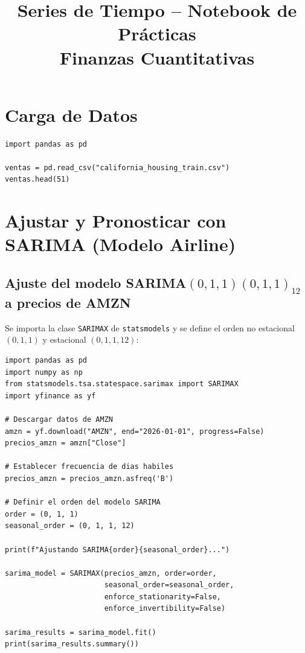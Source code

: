 \documentclass[12pt, a4paper]{article}
\title{%
  \LARGE \textbf{Series de Tiempo -- Notebook de Prácticas} \\[0.5em]
  \large Finanzas Cuantitativas
}
\author{}
\date{}
\begin{document}
\maketitle
\tableofcontents
\newpage

\section{Carga de Datos}

\begin{lstlisting}
import pandas as pd

ventas = pd.read_csv("california_housing_train.csv")
ventas.head(51)
\end{lstlisting}

\section{Ajustar y Pronosticar con SARIMA (Modelo Airline)}

\subsection{Ajuste del modelo SARIMA$(0,1,1)(0,1,1)_{12}$ a precios de AMZN}

Se importa la clase \texttt{SARIMAX} de \texttt{statsmodels} y se define el orden
no estacional $(0,1,1)$ y estacional $(0,1,1,12)$:

\begin{lstlisting}
import pandas as pd
import numpy as np
from statsmodels.tsa.statespace.sarimax import SARIMAX
import yfinance as yf

# Descargar datos de AMZN
amzn = yf.download("AMZN", end="2026-01-01", progress=False)
precios_amzn = amzn["Close"]

# Establecer frecuencia de dias habiles
precios_amzn = precios_amzn.asfreq('B')

# Definir el orden del modelo SARIMA
order = (0, 1, 1)
seasonal_order = (0, 1, 1, 12)

print(f"Ajustando SARIMA{order}{seasonal_order}...")

sarima_model = SARIMAX(precios_amzn, order=order,
                       seasonal_order=seasonal_order,
                       enforce_stationarity=False,
                       enforce_invertibility=False)

sarima_results = sarima_model.fit()
print(sarima_results.summary())
\end{lstlisting}
\end{document}
